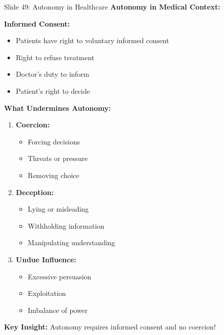 \documentclass[8pt]{beamer}
\begin{document}
	\begin{frame}{Slide 49: Autonomy in Healthcare}
		\fontsize{6.5}{7.5}\selectfont
		\textbf{Autonomy in Medical Context:}
		
		\vspace{0.1cm}
		\textbf{Informed Consent:}
		\begin{itemize}
			\item Patients have right to voluntary informed consent
			\item Right to refuse treatment
			\item Doctor's duty to inform
			\item Patient's right to decide
		\end{itemize}
		
		\vspace{0.1cm}
		\textbf{What Undermines Autonomy:}
		\begin{enumerate}
			\item \textbf{Coercion:}
			\begin{itemize}
				\item Forcing decisions
				\item Threats or pressure
				\item Removing choice
			\end{itemize}
			\item \textbf{Deception:}
			\begin{itemize}
				\item Lying or misleading
				\item Withholding information
				\item Manipulating understanding
			\end{itemize}
			\item \textbf{Undue Influence:}
			\begin{itemize}
				\item Excessive persuasion
				\item Exploitation
				\item Imbalance of power
			\end{itemize}
		\end{enumerate}
		
		\textcolor{myblue}{\textbf{Key Insight:}} Autonomy requires \textcolor{myblue}{informed consent and no coercion}!
	\end{frame}
	
\end{document}
